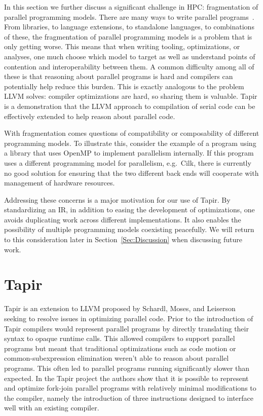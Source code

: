 \documentclass[sigconf]{acmart}
\begin{document}
In this section we further discuss a significant challenge in HPC:
fragmentation of parallel programming models. There are many ways to write
parallel programs~\cite{openmp, qthreads, chapel, cilk, kokkos, legion, upc,
mpi}.  From libraries, to language extensions, to standalone languages, to
combinations of these, the fragmentation of parallel programming models is a
problem that is only getting worse. This means that when writing tooling,
optimizations, or analyses, one much choose which model to target as well as
understand points of contention and interoperability between them. A common
difficulty among all of these is that reasoning about parallel programs is hard
and compilers can potentially help reduce this burden. This is exactly
analogous to the problem LLVM solves: compiler optimizations are hard, so
sharing them is valuable. Tapir is a demonstration that the LLVM approach to
compilation of serial code can be effectively extended to help reason about
parallel code. 

With fragmentation comes questions of compatibility or composability of 
different programming models. To illustrate this, consider the example of
a program using a library that uses OpenMP to implement parallelism internally. 
If this program uses a different programming model for parallelism, e.g.\ Cilk,
there is currently no good solution for ensuring that the two different back ends
will cooperate with management of hardware resources. 

Addressing these concerns is a major motivation for our use of Tapir.  By
standardizing an IR, in addition to easing the development of optimizations,
one avoids duplicating work across different implementations. It also enables
the possibility of multiple programming models coexisting peacefully. We will
return to this consideration later in Section~\ref{Sec:Discussion} when
discussing future work.

\section{Tapir} \label{Sec:Tapir}
Tapir is an extension to LLVM proposed by Schardl, Moses, and Leiserson
seeking to resolve issues in optimizing parallel code. Prior to
the introduction of Tapir compilers would represent parallel programs
by directly translating their syntax to opaque runtime calls. This allowed
compilers to support parallel programs but meant that traditional 
optimizations such as code motion or common-subexpression elimination weren't
able to reason about parallel programs. This often led to parallel programs
running significantly slower than expected. In the Tapir project the authors
show that it is possible to represent and optimize fork-join parallel programs
with relatively minimal modifications to the compiler, namely the introduction
of three instructions designed to interface well with an existing compiler.
\end{document}
